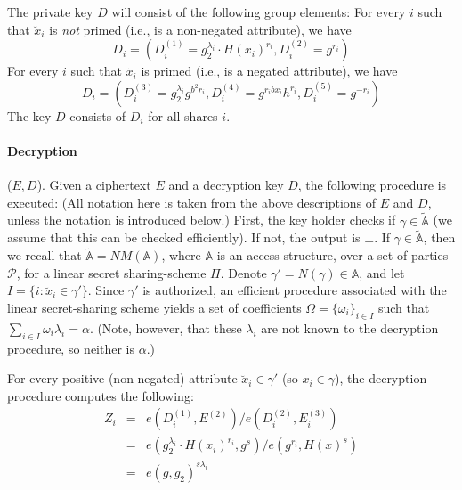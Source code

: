 The private key $D$ will consist of the following group elements:
For every $i$ such that $\breve{x}_i$ is \emph{not} primed (i.e., is a non-negated
attribute), we have $$D_i =
(D^{(1)}_i = g_2^{\lambda_i} \cdot H(x_i)^{r_i},
D^{(2)}_i = g^{r_i})$$
For every $i$ such that $\breve{x}_i$ is primed (i.e., is a negated attribute), we have
$$D_i = (
D^{(3)}_i = g_2^{\lambda_i}g^{b^2r_i},
D^{(4)}_i = g^{r_ibx_i}h^{r_i},
D^{(5)}_i = g^{-r_i})$$  The key $D$ consists of $D_i$ for all shares $i$.


\paragraph{Decryption} ($E,D$).
Given a ciphertext $E$ and a decryption key $D$, the following procedure is executed:
 (All notation here is taken from the above descriptions of $E$ and $D$, unless the
notation is introduced below.)
First, the key holder checks if $\gamma \in \mathbb{\tilde{A}}$ (we assume that
 this can be checked efficiently).
If not, the output is $\bot$.
If $\gamma \in \mathbb{\tilde{A}}$, then we recall that $\mathbb{\tilde{A}} = NM(\mathbb{A})$,
where $\mathbb{A}$ is an access structure, over a
set of parties $\mathcal{P}$, for a
linear secret sharing-scheme $\Pi$.
Denote $\gamma' = N(\gamma) \in \mathbb{A}$,
and let $I = \{i: \breve{x}_i \in \gamma' \}$.
Since $\gamma'$ is authorized, an efficient procedure associated with the
linear secret-sharing scheme yields a set of coefficients
$\Omega = \{\omega_i\}_{i \in I}$ such that
$\sum_{i \in I} \omega_i \lambda_i = \alpha$.
(Note, however, that these $\lambda_i$ are not known to the decryption procedure, so neither is $\alpha$.)

For every positive (non negated) attribute $\breve{x}_i \in \gamma'$
(so $x_i \in \gamma$), the decryption procedure computes the following:
\begin{eqnarray*}
Z_i &=& e\left(D^{(1)}_i, E^{(2)}\right) / e\left(D^{(2)}_i, E^{(3)}_i\right)\\
&=& e\left(g_2^{\lambda_i} \cdot H(x_i)^{r_i}, g^s\right) /
e\left(g^{r_i}, H(x)^s\right) \\
&=& e\left(g,g_2\right)^{s \lambda_i}
\end{eqnarray*}

